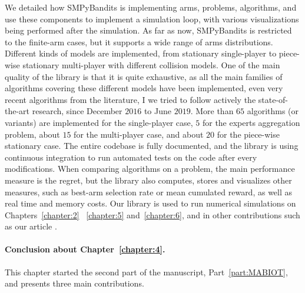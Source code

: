 We detailed how SMPyBandits is implementing arms, problems, algorithms, and use these components to implement a simulation loop, with various visualizations being performed after the simulation.
As far as now, SMPyBandits is restricted to the finite-arm cases, but it supports a wide range of arms distributions.
Different kinds of models are implemented, from stationary single-player to piece-wise stationary multi-player with different collision models.
One of the main quality of the library is that it is quite exhaustive, as all the main families of algorithms covering these different models have been implemented, even very recent algorithms from the literature, I we tried to follow actively the state-of-the-art research, since December $2016$ to June $2019$.
More than $65$ algorithms (or variants) are implemented for the single-player case, $5$ for the experts aggregation problem, about $15$ for the multi-player case, and about $20$ for the piece-wise stationary case.
The entire codebase is fully documented, and the library is using continuous integration to run automated tests on the code after every modifications.
%
When comparing algorithms on a problem, the main performance measure is the regret, but the library also computes, stores and visualizes other measures, such as best-arm selection rate or mean cumulated reward, as well as real time and memory costs.
%
Our library is used to run numerical simulations on Chapters~\ref{chapter:2}~ \ref{chapter:5} and~\ref{chapter:6}, and in other contributions such as our article \cite{Besson2018DoublingTricks}.


\paragraph{Conclusion about \textbf{Chapter~\ref{chapter:4}}.}

This chapter started the second part of the manuscript, Part~\ref{part:MABIOT}, and presents three main contributions.

